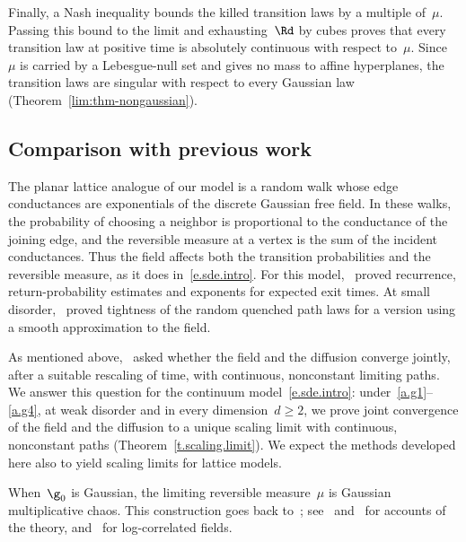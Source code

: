 \documentclass[11pt]{amsart}
\begin{document}
Finally, a Nash inequality bounds the killed transition laws by a multiple of~$\mu$. Passing this bound to the limit and exhausting~$\Rd$ by cubes proves that every transition law at positive time is absolutely continuous with respect to~$\mu$. Since~$\mu$ is carried by a Lebesgue-null set and gives no mass to affine hyperplanes, the transition laws are singular with respect to every Gaussian law (Theorem~\ref{lim:thm-nongaussian}).

\endgroup

\subsection{Comparison with previous work}
\label{ss.lit.review}

The planar lattice analogue of our model is a random walk whose edge conductances are exponentials of the discrete Gaussian free field. In these walks, the probability of choosing a neighbor is proportional to the conductance of the joining edge, and the reversible measure at a vertex is the sum of the incident conductances. Thus the field affects both the transition probabilities and the reversible measure, as it does in~\eqref{e.sde.intro}. For this model,~\citet*{BDG} proved recurrence, return-probability estimates and exponents for expected exit times. At small disorder,~\citet*{DW} proved tightness of the random quenched path laws for a version using a smooth approximation to the field.

\smallskip

As mentioned above,~\citet*[Problem~16.13]{BiskupSurvey} asked whether the field and the diffusion converge jointly, after a suitable rescaling of time, with continuous, nonconstant limiting paths. We answer this question for the continuum model~\eqref{e.sde.intro}: under~\ref{a.g1}--\ref{a.g4}, at weak disorder and in every dimension~$d\geq2$, we prove joint convergence of the field and the diffusion to a unique scaling limit with continuous, nonconstant paths (Theorem~\ref{t.scaling.limit}). We expect the methods developed here also to yield scaling limits for lattice models.

\smallskip

When~$\g_0$ is Gaussian, the limiting reversible measure~$\mu$ is Gaussian multiplicative chaos. This construction goes back to~\citet{Kahane}; see~\citet*{RVsurvey} and~\citet{Berestycki1} for accounts of the theory, and~\citet*{DRSV} for log-correlated fields.
\end{document}
